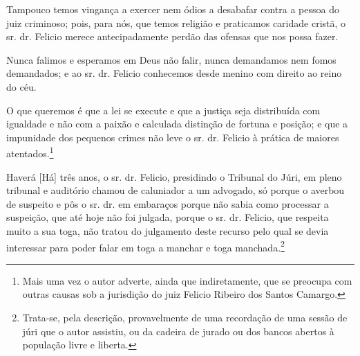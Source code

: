 Tampouco temos vingança a exercer nem ódios a desabafar contra a pessoa
do juiz criminoso; pois, para nós, que temos religião e praticamos
caridade cristã, o sr. dr. Felicio merece antecipadamente perdão das
ofensas que nos possa fazer.

Nunca falimos e esperamos em Deus não falir, nunca demandamos nem fomos
demandados; e ao sr. dr. Felicio conhecemos desde menino com direito ao
reino do céu.

O que queremos é que a lei se execute e que a justiça seja distribuída
com igualdade e não com a paixão e calculada distinção de fortuna e
posição; e que a impunidade dos pequenos crimes não leve o sr. dr.
Felicio à prática de maiores atentados.\footnote{ Mais uma vez o autor
  adverte, ainda que indiretamente, que se preocupa com outras causas
  sob a jurisdição do juiz Felicio Ribeiro dos Santos Camargo.}

Haverá {[}Há{]} três anos, o sr. dr. Felicio, presidindo o Tribunal do
Júri, em pleno tribunal e auditório chamou de caluniador a um advogado,
só porque o averbou de suspeito e pôs o sr. dr. em embaraços porque não
sabia como processar a suspeição, que até hoje não foi julgada, porque o
sr. dr. Felicio, que respeita muito a sua toga, não tratou do julgamento
deste recurso pelo qual se devia interessar para poder falar em toga a
manchar e toga manchada.\footnote{ Trata-se, pela descrição,
  provavelmente de uma recordação de uma sessão de júri que o autor
  assistiu, ou da cadeira de jurado ou dos bancos abertos à população
  livre e liberta.}


